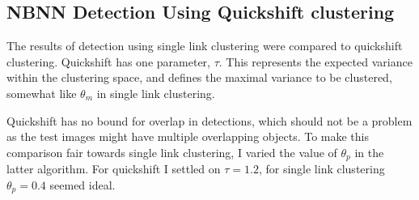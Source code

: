 \subsection{NBNN Detection Using Quickshift clustering} %
\label{sub:nbnn_detection_using_quickshift_clustering}

The results of detection using single link clustering were compared to quickshift clustering. Quickshift has one parameter, $\tau$. This represents the expected variance within the clustering space, and defines the maximal variance to be clustered, somewhat like $\theta_m$ in single link clustering.

Quickshift has no bound for overlap in detections, which should not be a problem as the test images might have multiple overlapping objects. To make this comparison fair towards single link clustering, I varied the value of $\theta_p$ in the latter algorithm. For quickshift I settled on $\tau = 1.2$, for single link clustering $\theta_p = 0.4$ seemed ideal.

% 
% 
% 
% 
% 


